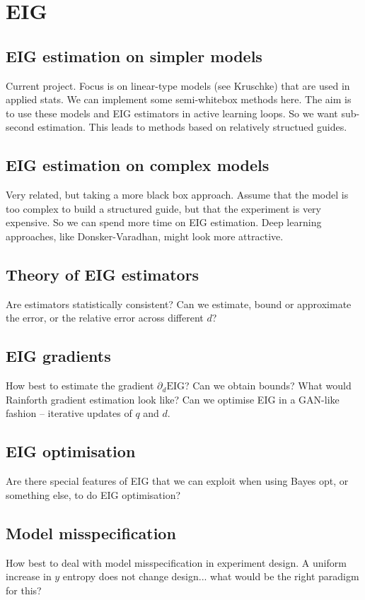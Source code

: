 \section{EIG}
\subsection{EIG estimation on simpler models}
Current project. Focus is on linear-type models (see Kruschke) that are used in applied stats. We can implement some semi-whitebox methods here. The aim is to use these models and EIG estimators in active learning loops. So we want sub-second estimation. This leads to methods based on relatively structued guides.

\subsection{EIG estimation on complex models}
Very related, but taking a more black box approach. Assume that the model is too complex to build a structured guide, but that the experiment is very expensive. So we can spend more time on EIG estimation. Deep learning approaches, like Donsker-Varadhan, might look more attractive.

\subsection{Theory of EIG estimators}
Are estimators statistically consistent? Can we estimate, bound or approximate the error, or the relative error across different $d$?

\subsection{EIG gradients}
How best to estimate the gradient $\partial_d \text{EIG}$? Can we obtain bounds? What would Rainforth gradient estimation look like? Can we optimise EIG in a GAN-like fashion -- iterative updates of $q$ and $d$.

\subsection{EIG optimisation}
Are there special features of EIG that we can exploit when using Bayes opt, or something else, to do EIG optimisation?

\subsection{Model misspecification}
How best to deal with model misspecification in experiment design. A uniform increase in $y$ entropy does not change design... what would be the right paradigm for this?

